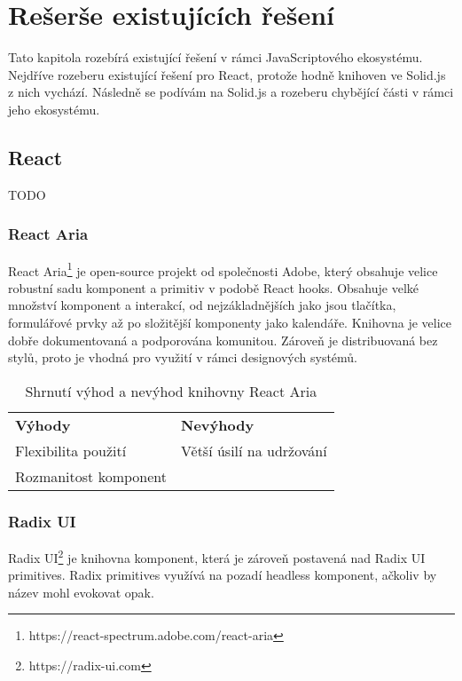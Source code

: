 \chapter{Rešerše existujících řešení}

Tato kapitola rozebírá existující řešení v rámci JavaScriptového ekosystému.
Nejdříve rozeberu existující řešení pro React, protože hodně knihoven ve Solid.js z nich vychází.
Následně se podívám na Solid.js a rozeberu chybějící části v rámci jeho ekosystému.

\section{React}

TODO

\subsection{React Aria}

React Aria\footnote{https://react-spectrum.adobe.com/react-aria} je open-source projekt od společnosti Adobe, který obsahuje velice robustní sadu komponent a primitiv v podobě React hooks.
Obsahuje velké množství komponent a interakcí, od nejzákladnějších jako jsou tlačítka, formulářové prvky až po složitější komponenty jako kalendáře.
Knihovna je velice dobře dokumentovaná a podporována komunitou.
Zároveň je distribuovaná bez stylů, proto je vhodná pro využití v rámci designových systémů.

\begin{table}[ht]
    \begin{ctucolortab}
        \begin{tabularx}{\textwidth}{Y Y}
            \bfseries \textcolor{OK}{Výhody} & \bfseries \textcolor{NOT_OK}{Nevýhody} \\\Midrule{}
            Flexibilita použití              & Větší úsilí na udržování               \\
            Rozmanitost komponent
        \end{tabularx}
    \end{ctucolortab}
    \caption{Shrnutí výhod a nevýhod knihovny React Aria}
\end{table}

\subsection{Radix UI}

Radix UI\footnote{https://radix-ui.com} je knihovna komponent, která je zároveň postavená nad Radix UI primitives.
Radix primitives využívá na pozadí headless komponent, ačkoliv by název mohl evokovat opak.

